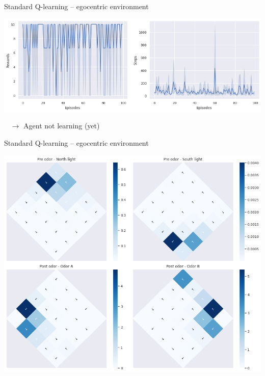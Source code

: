 \documentclass[bigger]{beamer}
\begin{document}
\begin{frame}[label={sec:org698ab6d}]{Standard Q-learning -- egocentric environment}
\begin{center}
\includegraphics[width=.9\linewidth]{img/q-learning_ego_steps_rewards.png}
\end{center}
\begin{block}{~}
\centering
\(\to\) Agent not learning (yet)
\end{block}
\end{frame}
\begin{frame}[label={sec:org7fc92e0}]{Standard Q-learning -- egocentric environment}
\begin{center}
\includegraphics[height=0.9\textheight]{img/q-learning_ego_best_actions_maps.png}
\end{center}
\end{frame}
\end{document}
